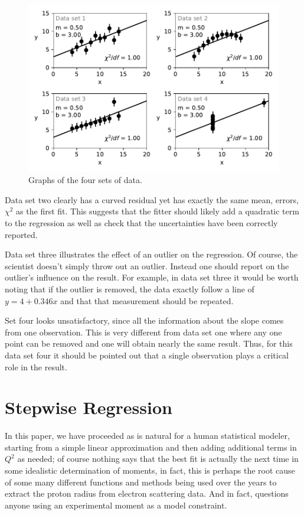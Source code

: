 \documentclass[10pt,superscriptaddress,aps,prc,twocolumn]{revtex4-1}
\begin{document}
\begin{appendix}
\begin{figure}[htb]
\includegraphics[width=\columnwidth]{Figure/SameChi2.pdf}
\caption{Graphs of the four sets of data.}
\label{SameChi2}
\end{figure}

Data set two clearly has a curved residual yet has exactly the 
same mean, errors, $\chi^2$ as the first fit.   This suggests that the fitter 
should likely add a quadratic term to the regression as well as check that
the uncertainties have been correctly reported.

Data set three illustrates the effect of an outlier on the regression.
Of course, the scientist doesn't simply throw out an outlier.
Instead one should report on the outlier's influence on the result.   For example,
in data set three it would be worth noting that if the outlier is removed, the data
exactly follow a line of $y = 4 + 0.346 x$ and that that measurement should be repeated.

Set four looks unsatisfactory, since all the information about the slope comes
from one observation.   This is very different from data set one where any one point
can be removed and one will obtain nearly the same result.   Thus, for this data set
four it should be pointed out that a single observation plays a critical role
in the result.

\section{Stepwise Regression}

In this paper, we have proceeded as is natural for a human statistical modeler, starting from a simple
linear approximation and then adding additional terms in $Q^2$ as needed; of course nothing
says that the best fit is actually the next time in some idealistic determination of moments,
in fact, this is perhaps the root cause of some many different functions and methods being used
over the years to extract the proton radius from electron scattering data.   And in fact, questions
anyone using an experimental moment as a model constraint.


\end{appendix}
\end{document}
